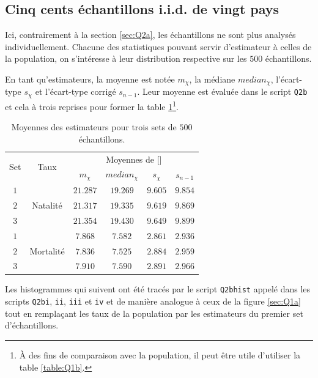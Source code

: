 \documentclass[a4paper, 12pt]{article}
\def\ptsd{\textperthousand}
\begin{document}
	\subsection{Cinq cents échantillons i.i.d. de vingt pays} \label{sec:Q2b}
	Ici, contrairement à la section \ref{sec:Q2a}, les échantillons ne sont plus analysés individuellement. Chacune des statistiques pouvant servir d'estimateur à celles de la population, on s'intéresse à leur distribution respective sur les $500$ échantillons. \par
	En tant qu'estimateurs, la moyenne est notée $m_{\chi}$, la médiane $median_{\chi}$, l'écart-type $s_{\chi}$ et l'écart-type corrigé $s_{n-1}$. Leur moyenne est évaluée dans le script \texttt{Q2b} et cela à trois reprises pour former la table \ref{table:Q2b}\footnote{À des fins de comparaison avec la population, il peut être utile d'utiliser la table \ref{table:Q1b}.}. \par
	\begin{table}[h!]
		\centering
		\begin{tabular}{|c|c|c|c|c|c|}
			\hline
			\multirow{2}{*}{Set} &   \multirow{2}{*}{Taux}    &             \multicolumn{4}{c|}{Moyennes de [\ptsd]}             \\ \cline{3-6}
			                     &                            &   $m_{\chi}$   & $median_{\chi}$ &  $s_{\chi}$   &   $s_{n-1}$   \\ \hline\hline
			        $1$          & \multirow{3}{*}{Natalité}  & $\num{21.287}$ & $\num{19.269}$  & $\num{9.605}$ & $\num{9.854}$ \\ \cline{1-1}\cline{3-6}
			        $2$          &                            & $\num{21.317}$ & $\num{19.335}$  & $\num{9.619}$ & $\num{9.869}$ \\ \cline{1-1}\cline{3-6}
			        $3$          &                            & $\num{21.354}$ & $\num{19.430}$  & $\num{9.649}$ & $\num{9.899}$ \\ \hline\hline
			        $1$          & \multirow{3}{*}{Mortalité} & $\num{7.868}$  &  $\num{7.582}$  & $\num{2.861}$ & $\num{2.936}$ \\ \cline{1-1}\cline{3-6}
			        $2$          &                            & $\num{7.836}$  &  $\num{7.525}$  & $\num{2.884}$ & $\num{2.959}$ \\ \cline{1-1}\cline{3-6}
			        $3$          &                            & $\num{7.910}$  &  $\num{7.590}$  & $\num{2.891}$ & $\num{2.966}$ \\ \hline
		\end{tabular}
		\caption{Moyennes des estimateurs pour trois sets de $500$ échantillons.}
		\label{table:Q2b}
	\end{table}
	Les histogrammes qui suivent ont été tracés par le script \texttt{Q2bhist} appelé dans les scripts \texttt{Q2bi}, \texttt{ii}, \texttt{iii} et \texttt{iv} et de manière analogue à ceux de la figure \ref{sec:Q1a} tout en remplaçant les taux de la population par les estimateurs du premier set d'échantillons.
\end{document}

